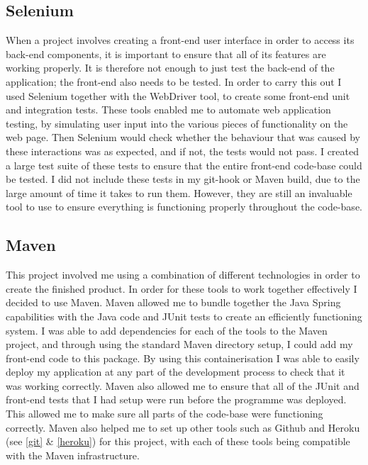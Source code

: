\subsection{Selenium \label{selenium}}

When a project involves creating a front-end user interface in order to access its back-end components, it is important to ensure that all of its features are working properly. It is therefore not enough to just test the back-end of the application; the front-end also needs to be tested. In order to carry this out I used Selenium together with the WebDriver tool, to create some front-end unit and integration tests. These tools enabled me to automate web application testing, by simulating user input into the various pieces of functionality on the web page. Then Selenium would check whether the behaviour that was caused by these interactions was as expected, and if not, the tests would not pass. I created a large test suite of these tests to ensure that the entire front-end code-base could be tested. I did not include these tests in my git-hook or Maven build, due to the large amount of time it takes to run them. However, they are still an invaluable tool to use to ensure everything is functioning properly throughout the code-base.

\subsection{Maven \label{maven}}

This project involved me using a combination of different technologies in order to create the finished product. In order for these tools to work together effectively I decided to use Maven. Maven allowed me to bundle together the Java Spring capabilities with the Java code and JUnit tests to create an efficiently functioning system. I was able to add dependencies for each of the tools to the Maven project, and through using the standard Maven directory setup, I could add my front-end code to this package. By using this containerisation I was able to easily deploy my application at any part of the development process to check that it was working correctly. Maven also allowed me to ensure that all of the JUnit and front-end tests that I had setup were run before the programme was deployed. This allowed me to make sure all parts of the code-base were functioning correctly. Maven also helped me to set up other tools such as Github and Heroku (see \ref{git} \& \ref{heroku}) for this project, with each of these tools being compatible with the Maven infrastructure.


